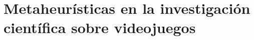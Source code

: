 


\section{Metaheurísticas en la investigación científica sobre videojuegos} \label{sec:estado_arte}




